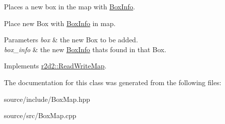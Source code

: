 Places a new box in the map with \hyperlink{classr2d2_1_1_box_info}{Box\+Info}. 

Place new Box with \hyperlink{classr2d2_1_1_box_info}{Box\+Info} in map.


\begin{DoxyParams}{Parameters}
{\em box} & the new Box to be added. \\
\hline
{\em box\+\_\+info} & the new \hyperlink{classr2d2_1_1_box_info}{Box\+Info} thats found in that Box. \\
\hline
\end{DoxyParams}


Implements \hyperlink{classr2d2_1_1_read_write_map_a8169c7a36a66b824403a4df7a91d232d}{r2d2\+::\+Read\+Write\+Map}.



The documentation for this class was generated from the following files\+:\begin{DoxyCompactItemize}
\item 
source/include/Box\+Map.\+hpp\item 
source/src/Box\+Map.\+cpp\end{DoxyCompactItemize}
